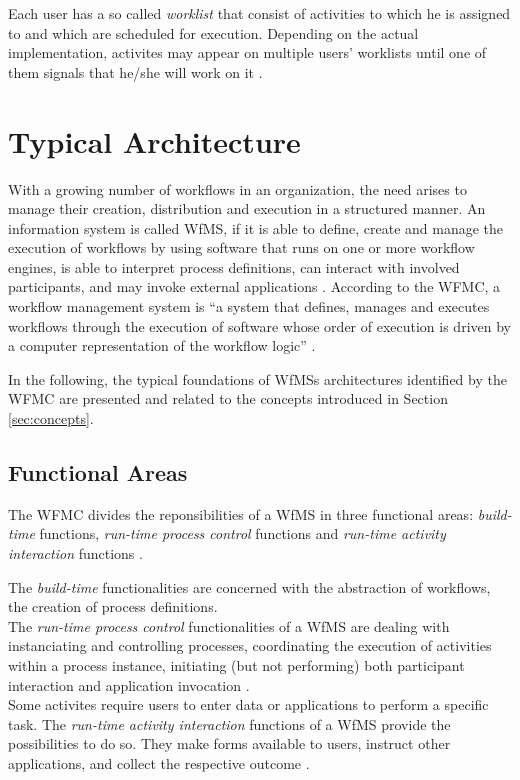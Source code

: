     Each user has a so called \emph{worklist} that consist of activities to which he is assigned to and which are scheduled for execution. Depending on the actual implementation, activites may appear on multiple users' worklists until one of them signals that he/she will work on it \cite{Hollingsworth1995Wfmc,Casati1999Specification}.


\section{Typical Architecture} %
\label{sec:typical_architecture}
  With a growing number of workflows in an organization, the need arises to manage their creation, distribution and execution in a structured manner. An information system is called \ac{WfMS}, if it is able to define, create and manage the execution of workflows by using software that runs on one or more workflow engines, is able to interpret process definitions, can interact with involved participants, and may invoke external applications \cite{Lawrence1997Workflow}. According to the \ac{WFMC}, a workflow management system is ``a system that defines, manages and executes workflows through the execution of software whose order of execution is driven by a computer representation of the workflow logic'' \cite{Hollingsworth1995Wfmc}.

  In the following, the typical foundations of \acp{WfMS} architectures identified by the \ac{WFMC} are presented and related to the concepts introduced in Section \ref{sec:concepts}.

  \subsection{Functional Areas} %
  \label{sub:functional_areas}
    The \ac{WFMC} divides the reponsibilities of a \ac{WfMS} in three functional areas: \emph{build-time} functions, \emph{run-time process control} functions and \emph{run-time activity interaction} functions \cite{Hollingsworth1995Wfmc,Alonso1997Functionality}.

    The \emph{build-time} functionalities are concerned with the abstraction of workflows, \ie the creation of process definitions.\\
    The \emph{run-time process control} functionalities of a \ac{WfMS} are dealing with instanciating and controlling processes, coordinating the execution of activities within a process instance, initiating (but not performing) both participant interaction and application invocation \cite{Hollingsworth1995Wfmc}.\\
    Some activites require users to enter data or applications to perform a specific task. The \emph{run-time activity interaction} functions of a \ac{WfMS} provide the possibilities to do so. They make forms available to users, instruct other applications, and collect the respective outcome \cite{Hollingsworth1995Wfmc}.

